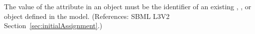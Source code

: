 The value of the attribute  in an \InitialAssignment object
must be the identifier of an existing \Compartment, \Species,
\Parameter or \SpeciesReference object defined in the model.  (References:
SBML L3V2 Section~\ref{sec:initialAssignment}.)
